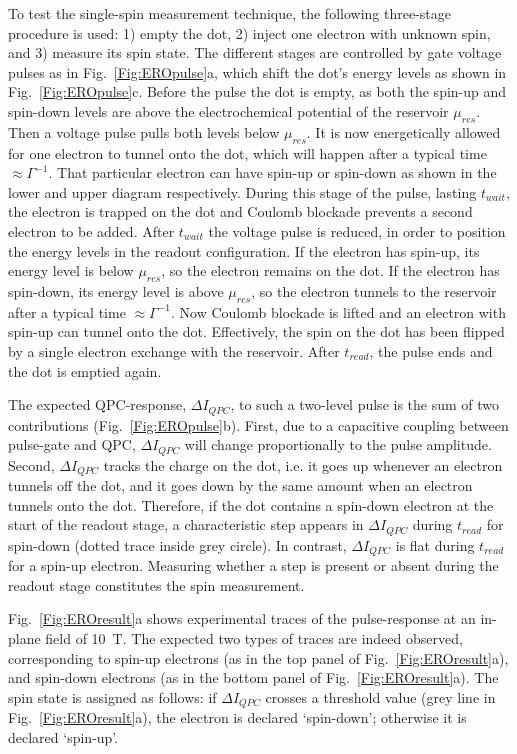 \documentclass[12pt,aps,nofootinbib]{revtex4-1}
\begin{document}
To test the single-spin measurement technique, the following
three-stage procedure is used: 1) empty the dot, 2) inject one
electron with unknown spin, and 3) measure its spin state. The
different stages are controlled by gate voltage pulses as in
Fig.~\ref{Fig:EROpulse}a, which shift the dot's energy levels as
shown in Fig.~\ref{Fig:EROpulse}c. Before the pulse the dot is
empty, as both the spin-up and spin-down levels are above the
electrochemical potential of the reservoir $\mu_{res}$. Then a
voltage pulse pulls both levels below $\mu_{res}$. It is now
energetically allowed for one electron to tunnel onto the dot,
which will happen after a typical time $\approx \Gamma^{-1}$. That
particular electron can have spin-up or spin-down as shown in the
lower and upper diagram respectively. During this stage of the
pulse, lasting $t_{wait}$, the electron is trapped on the dot and
Coulomb blockade prevents a second electron to be added. After
$t_{wait}$ the voltage pulse is reduced, in order to position the
energy levels in the readout configuration. If the electron has
spin-up, its energy level is below $\mu_{res}$, so the electron
remains on the dot. If the electron has spin-down, its energy
level is above $\mu_{res}$, so the electron tunnels to the
reservoir after a typical time $\approx \Gamma^{-1}$. Now Coulomb
blockade is lifted and an electron with spin-up can tunnel onto
the dot. Effectively, the spin on the dot has been flipped by a
single electron exchange with the reservoir. After $t_{read}$, the
pulse ends and the dot is emptied again.

The expected QPC-response, $\Delta I_{QPC}$, to such a two-level
pulse is the sum of two contributions (Fig.~\ref{Fig:EROpulse}b).
First, due to a capacitive coupling between pulse-gate and QPC,
$\Delta I_{QPC}$ will change proportionally to the pulse
amplitude. Second, $\Delta I_{QPC}$ tracks the charge on the dot,
i.e. it goes up whenever an electron tunnels off the dot, and it
goes down by the same amount when an electron tunnels onto the
dot. Therefore, if the dot contains a spin-down electron at the
start of the readout stage, a characteristic step appears in
$\Delta I_{QPC}$ during $t_{read}$ for spin-down (dotted trace
inside grey circle). In contrast, $\Delta I_{QPC}$ is flat during
$t_{read}$ for a spin-up electron. Measuring whether a step is
present or absent during the readout stage constitutes the spin
measurement.

Fig.~\ref{Fig:EROresult}a shows experimental traces of the
pulse-response at an in-plane field of 10~T. The expected two
types of traces are indeed observed, corresponding to spin-up
electrons (as in the top panel of Fig.~\ref{Fig:EROresult}a), and
spin-down electrons (as in the bottom panel of
Fig.~\ref{Fig:EROresult}a). The spin state is assigned as follows:
if $\Delta I_{QPC}$ crosses a threshold value (grey line in
Fig.~\ref{Fig:EROresult}a), the electron is declared `spin-down';
otherwise it is declared `spin-up'.
\end{document}
